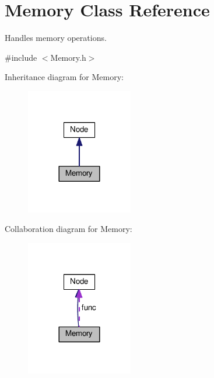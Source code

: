 \hypertarget{classMemory}{}\section{Memory Class Reference}
\label{classMemory}


Handles memory operations.  




{\ttfamily \#include $<$Memory.\+h$>$}



Inheritance diagram for Memory\+:\nopagebreak
\begin{figure}[H]
\begin{center}
\leavevmode
\includegraphics[width=132pt]{classMemory__inherit__graph}
\end{center}
\end{figure}


Collaboration diagram for Memory\+:\nopagebreak
\begin{figure}[H]
\begin{center}
\leavevmode
\includegraphics[width=132pt]{classMemory__coll__graph}
\end{center}
\end{figure}
